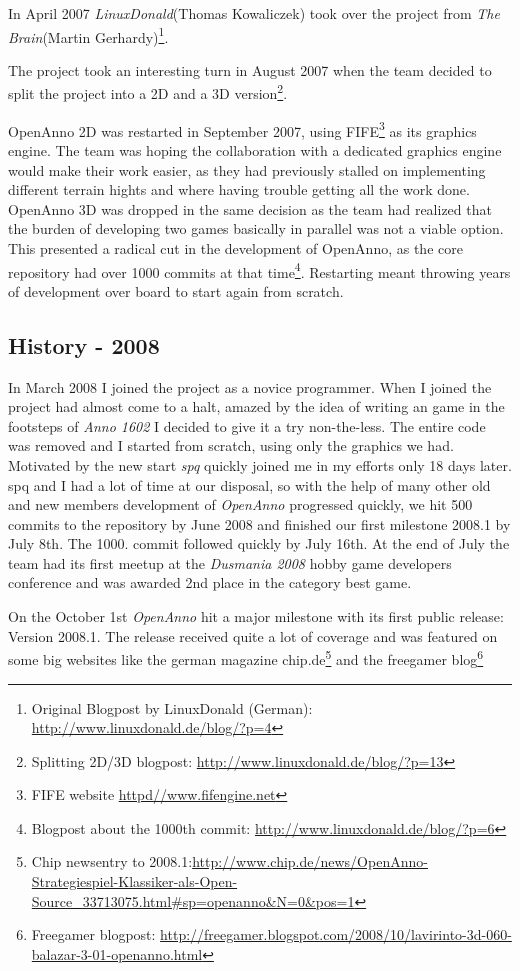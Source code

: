 In April 2007 \textit{LinuxDonald}(Thomas Kowaliczek) took over the project from
\textit{The Brain}(Martin Gerhardy)\footnote{Original Blogpost by LinuxDonald (German):
\url{http://www.linuxdonald.de/blog/?p=4}}.

The project took an interesting turn in August 2007 when the team decided to
split the project into a 2D and a 3D version\footnote{Splitting 2D/3D blogpost:
\url{http://www.linuxdonald.de/blog/?p=13}}.

OpenAnno 2D was restarted in September 2007, using FIFE\footnote{FIFE
website \url{httpd//www.fifengine.net}} as its graphics engine. The team was hoping the collaboration with a dedicated
graphics engine would make their work easier, as they had previously stalled on implementing different terrain hights
and where having trouble getting all the work done. OpenAnno 3D was dropped in the same decision as the team had
realized that the burden of developing two games basically in parallel was not a viable option. This presented a radical
cut in the development of OpenAnno, as the core repository had over 1000 commits at that time\footnote{Blogpost about
the 1000th commit: \url{http://www.linuxdonald.de/blog/?p=6}}. Restarting meant throwing years of development over board
to start again from scratch.

\subsection{History - 2008}
In March 2008 I joined the project as a novice programmer. When I joined the project had almost come to a halt, amazed
by the idea of writing an \OS{} game in the footsteps of \textit{Anno 1602} I decided to give it a try non-the-less. The
entire code was removed and I started from scratch, using only the graphics we had. Motivated by the new start
\textit{spq} quickly joined me in my efforts only 18 days later. spq and I had a lot of time at our disposal, so with
the help of many other old and new members development of \textit{OpenAnno} progressed quickly, we hit 500 commits to the repository
by June 2008 and finished our first milestone 2008.1 by July 8th. The 1000. commit followed quickly by July 16th. At the
end of July the team had its first meetup at the \textit{Dusmania 2008} hobby game developers conference and was awarded
2nd place in the category best game.

On the October 1st \textit{OpenAnno} hit a major milestone with its first public release: Version 2008.1. The release
received quite a lot of coverage and was featured on some big websites like the german magazine chip.de\footnote{Chip newsentry to
2008.1:\url{http://www.chip.de/news/OpenAnno-Strategiespiel-Klassiker-als-Open-Source_33713075.html\#sp=openanno&N=0&pos=1}}
and the freegamer blog\footnote{Freegamer blogpost: \url{http://freegamer.blogspot.com/2008/10/lavirinto-3d-060-balazar-3-01-openanno.html}}


